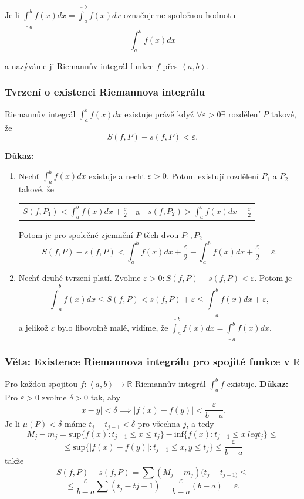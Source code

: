 \documentclass[10pt]{article}
\begin{document}
Je li $\underline{\int}^b_a f(x) dx = \overline{\int}^b_a f(x) dx$ označujeme společnou hodnotu
\[\int^b_a f(x) dx\]

a nazýváme ji Riemannův integrál funkce $f$ přes $\left<a,b\right>$.
\noindent
\subsubsection{Tvrzení o existenci Riemannova integrálu}
\hspace{1.2mm}
Riemannův integrál $\int^b_a f(x) dx$ existuje právě když $\forall \varepsilon > 0 \exists$ rozdělení $P$ takové, že
\[S(f,P) - s(f,P) < \varepsilon.\]

\vspace{5mm}
\noindent
\textbf{Důkaz:} 
\begin{enumerate}
    \item Nechť $\int^b_a f(x) dx$ existuje a nechť $\varepsilon > 0$. Potom existují rozdělení $P_1$ a $P_2$ takové, že
    \begin{center}
        \begin{tabular}{ c c c }
            $S(f,P_1) < \int^b_a f(x) dx + \frac{\varepsilon}{2}$ & a & $s(f,P_2) > \int^b_a f(x) dx+\frac{\varepsilon}{2}$  \\
        \end{tabular}
    \end{center}
    Potom je pro společné zjemnění $P$ těch dvou $P_1,P_2$
    \[S(f,P) - s(f,P) < \int^b_a f(x)dx + \frac{\varepsilon}{2} - \int^b_a f(x)dx + \frac{\varepsilon}{2} = \varepsilon.\]
    \item Nechť druhé tvrzení platí. Zvolme $\varepsilon > 0 : S(f,P) - s(f,P) < \varepsilon.$ Potom je 
    \[\overline{\int}^b_a f(x)dx \leq S(f,P) < s(f,P) + \varepsilon \leq \underline{\int}^b_a f(x)dx + \varepsilon,\]
    a jelikož $\varepsilon$ bylo libovolně malé, vidíme, že $\overline{\int}^b_a f(x)dx = \underline{\int}^b_a f(x)dx.$
\end{enumerate}
\noindent


\subsubsection{Věta: Existence Riemannova integrálu pro spojité funkce v $\mathbb{R}$}
\hspace{1.2mm}
Pro každou spojitou $f : \left<a,b\right> \rightarrow \mathbb{R}$ Riemannův integrál $\int^b_a f$ existuje.
\vspace{5mm}
\noindent
\textbf{Důkaz:} Pro $\varepsilon > 0 $ zvolme $\delta > 0$ tak, aby 
\[|x-y| < \delta \implies |f(x) - f(y)| < \frac{\varepsilon}{b-a}.\]
Je-li $\mu(P) < \delta$ máme $t_j-t_{j-1} < \delta$ pro všechna $j$, a tedy
\[M_j - m_j = \text{sup}\{f(x) : t_{j-1} \leq x \leq t_j\} - \text{inf}\{f(x) : t_{j-1} \leq x \ leq t_j\} \leq\]
\[\leq \text{sup}\{|f(x) - f(y)| : t_{j-1} \leq x,y \leq t_j\} \leq \frac{\varepsilon}{b-a}\]
takže
\[S(f,P) - s(f,P) = \sum (M_j - m_j)(t_j-t_{j-1)}\leq\]
\[\leq \frac{\varepsilon}{b-a}\sum (t_j-t{j-1}) = \frac{\varepsilon}{b-a}(b-a) = \varepsilon.\]
\end{document}
